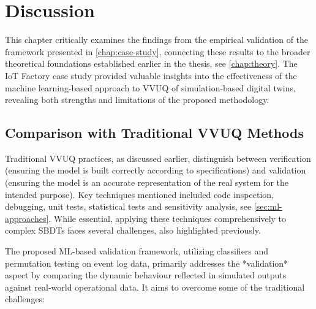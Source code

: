 \chapter{Discussion}
\label{chap:discussion}

This chapter critically examines the findings from the empirical validation of the framework presented in \autoref{chap:case-study}, connecting these results to the broader theoretical foundations established earlier in the thesis, see \autoref{chap:theory}. The IoT Factory case study provided valuable insights into the effectiveness of the machine learning-based approach to VVUQ of simulation-based digital twins, revealing both strengths and limitations of the proposed methodology.

\section{Comparison with Traditional VVUQ Methods}
\label{sec:comparison_manual}

Traditional VVUQ practices, as discussed earlier, distinguish between verification (ensuring the model is built correctly according to specifications) and validation (ensuring the model is an accurate representation of the real system for the intended purpose). Key techniques mentioned included code inspection, debugging, unit tests, statistical tests and sensitivity analysis, see \autoref{sec:ml-approaches}. While essential, applying these techniques comprehensively to complex SBDTs faces several challenges, also highlighted previously.

The proposed ML-based validation framework, utilizing classifiers and permutation testing on event log data, primarily addresses the *validation* aspect by comparing the dynamic behaviour reflected in simulated outputs against real-world operational data. It aims to overcome some of the traditional challenges:

